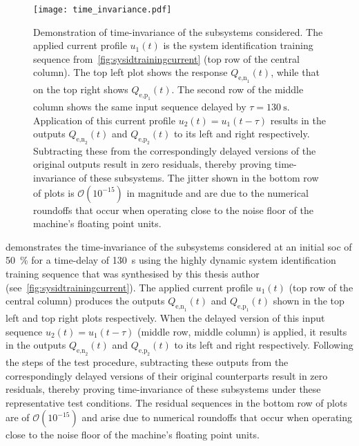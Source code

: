 \begin{figure}[!htb]
    \centering
    \texttt{[image: time\_invariance.pdf]}
    \caption[Demonstration of time-invariance of $Q_\text{e,n}(t)$ and
    $Q_\text{e,p}(t)$ subsystems]{Demonstration of time-invariance of the
        subsystems considered. The applied current profile $u_1(t)$ is the
        system identification training sequence
        from~\cref{fig:sysidtrainingcurrent} (top row of the central column).
        The top left plot shows the response $Q_{\text{e,n}_1}\!(t)$, while that
        on the top right shows $Q_{\text{e,p}_1}\!(t)$. The second row of the
        middle column shows the same input sequence delayed by $\tau =
        \SI{130}{\second}$. Application of this current profile $u_2(t) =
        u_1(t-\tau)$ results in the outputs $Q_{\text{e,n}_2}\!(t)$ and
        $Q_{\text{e,p}_2}\!(t)$ to its left and right respectively. Subtracting
        these from the correspondingly delayed versions of the original outputs
        result in zero residuals, thereby proving time-invariance of these
        subsystems. The jitter shown in the bottom row of plots is
        $\mathcal{O}(10^{-15})$ in magnitude and are due to the numerical
        roundoffs that occur when operating close to the noise floor of the
    machine's floating point units.}%
\label{fig:timeinvariance}
\end{figure}

  demonstrates the  time-invariance  of the  subsystems
considered  at  an  initial  \gls{soc} of  \SI{50}{\percent}  for  a  time-delay
of   \SI{130}{\second}   using   the  highly   dynamic   system   identification
training    sequence   that    was   synthesised    by   this    thesis   author
(see~\cref{fig:sysidtrainingcurrent}).  The  applied  current  profile  $u_1(t)$
(top row  of the  central column)  produces the  outputs $Q_{\text{e,n}_1}\!(t)$
and  $Q_{\text{e,p}_1}\!(t)$  shown  in  the   top  left  and  top  right  plots
respectively.  When  the delayed  version  of  this  input sequence  ${u_2(t)  =
u_1(t-\tau)}$ (middle row, middle column) is  applied, it results in the outputs
$Q_{\text{e,n}_2}\!(t)$  and  $Q_{\text{e,p}_2}\!(t)$  to  its  left  and  right
respectively.  Following the  steps  of the  test  procedure, subtracting  these
outputs from the correspondingly delayed versions of their original counterparts
result in  zero residuals, thereby  proving time-invariance of  these subsystems
under these representative test conditions. The residual sequences in the bottom
row of plots are of $\mathcal{O}(10^{-15})$ and arise due to numerical roundoffs
that occur  when operating close  to the noise  floor of the  machine's floating
point units.

